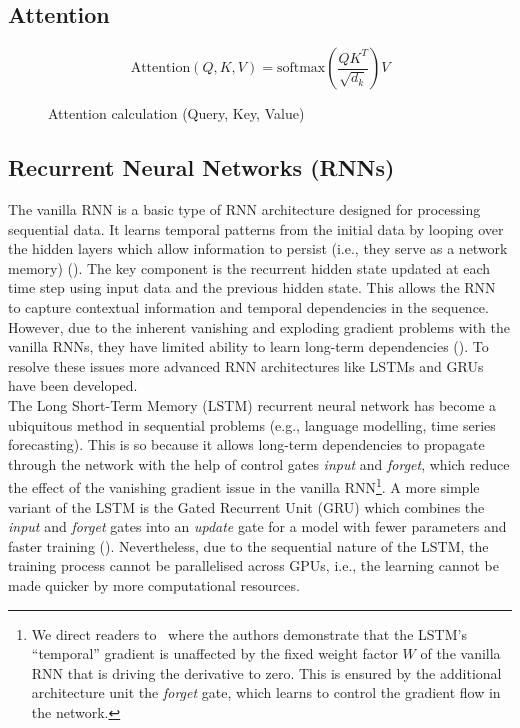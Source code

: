 \subsection{Attention}\label{subsec:attention}

\begin{figure}
    \begin{equation}
        \text{Attention}(Q, K, V) = \text{softmax}\left(\frac{QK^T}{\sqrt{d_k}}\right)V
    \end{equation}
    \caption{Attention calculation (Query, Key, Value)}
    \label{eq:attention}
\end{figure}

\subsection{Recurrent Neural Networks (RNNs)}\label{subsec:rnn}
The vanilla RNN is a basic type of RNN architecture designed for processing sequential data.
It learns temporal patterns from the initial data by looping over the hidden layers which allow information to persist (i.e., they serve as a network memory) (\cite{olah2015understandingLSTM}).
The key component is the recurrent hidden state updated at each time step using input data and the previous hidden state. 
This allows the RNN to capture contextual information and temporal dependencies in the sequence.
However, due to the inherent vanishing and exploding gradient problems with the vanilla RNNs, they have limited ability to learn long-term dependencies (\cite{bengio1994learning}).
To resolve these issues more advanced RNN architectures like LSTMs and GRUs have been developed. \\

The Long Short-Term Memory (LSTM) recurrent neural network has become a ubiquitous method in sequential problems (e.g., language modelling, time series forecasting).
This is so because it allows long-term dependencies to propagate through the network with the help of control gates \- \emph{input} and \emph{forget}, which reduce the effect of the vanishing gradient issue in the vanilla RNN\footnote{
    We direct readers to~\cite{bayer2015learning} where the authors demonstrate that the LSTM's \enquote{temporal} gradient is unaffected by the fixed weight factor $W$ of the vanilla RNN that is driving the derivative to zero. 
    This is ensured by the additional architecture unit \- the \emph{forget} gate, which learns to  control the gradient flow in the network.
}. 
A more simple variant of the LSTM is the Gated Recurrent Unit (GRU) which combines the \emph{input} and \emph{forget} gates into an \emph{update} gate for a model with fewer parameters and faster training (\cite{cahuantzi2021gru}).
Nevertheless, due to the sequential nature of the LSTM, the training process cannot be parallelised across GPUs, i.e., the learning cannot be made quicker by more computational resources.


